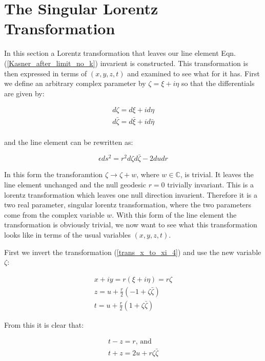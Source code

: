 \section{The Singular Lorentz Transformation}

In this section a Lorentz transformation that leaves our line element Eqn.(\ref{Kasner_after_limit_no_k}) invarient is constructed. This transformation is then expressed in terms of $(x,y,z,t)$ and examined to see what for it has. First we define an arbitrary complex parameter by $\zeta = \xi + i \eta$ so that the differentials are given by:

\begin{eqnarray*}
d\zeta = {d\xi} + i {d\eta} \\
d\bar{\zeta} = {d\bar{\xi}} + i {d\bar{\eta}} \\
\end{eqnarray*}

\noindent and the line element can be rewritten as:

\begin{equation*}
\epsilon {ds^2} = r^2 {d\zeta}{d\bar{\zeta}} - 2 {du}{dr}
\end{equation*}

\noindent In this form the transforamtion $\zeta \rightarrow \zeta + w$, where $w \in \mathbb{C}$, is trivial. It leaves the line element unchanged and the null geodesic $r = 0$ trivially invariant. This is a lorentz transformation which leaves one null direction invarient. Therefore it is a two real parameter, singular lorentz transformation, where the two parameters come from the complex variable $w$. With this form of the line element the transformation is obviously trivial, we now want to see what this transformation looks like in terms of the usual variables $(x,y,z,t)$.

First we invert the transformation (\ref{trans_x_to_xi_4}) and use the new variable $\zeta$:

\begin{eqnarray*} 
x + iy = r (\xi + i \eta) = r \zeta \\
z = u + \frac{r}{2}(-1 + \zeta \bar{\zeta}) \\
t = u + \frac{r}{2}(1 + \zeta \bar{\zeta})
\end{eqnarray*}

\noindent From this it is clear that:

\begin{eqnarray*}
t - z = r \text{, and } \\
t + z = 2 u + r \zeta \bar{\zeta} 
\end{eqnarray*}

